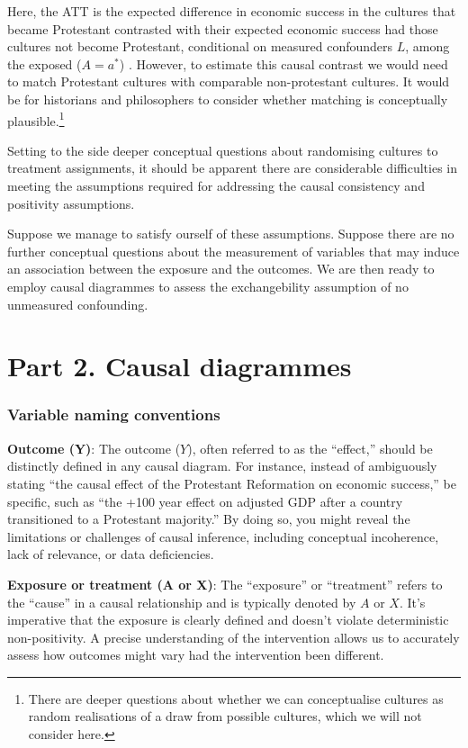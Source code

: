 \documentclass[
  singlecolumn]{report}
\begin{document}
Here, the ATT is the expected difference in economic success in the
cultures that became Protestant contrasted with their expected economic
success had those cultures not become Protestant, conditional on
measured confounders \(L\), among the exposed (\(A = a^*\)) . However,
to estimate this causal contrast we would need to match Protestant
cultures with comparable non-protestant cultures. It would be for
historians and philosophers to consider whether matching is conceptually
plausible.\footnote{There are deeper questions about whether we can
  conceptualise cultures as random realisations of a draw from possible
  cultures, which we will not consider here.}

Setting to the side deeper conceptual questions about randomising
cultures to treatment assignments, it should be apparent there are
considerable difficulties in meeting the assumptions required for
addressing the causal consistency and positivity assumptions.

Suppose we manage to satisfy ourself of these assumptions. Suppose there
are no further conceptual questions about the measurement of variables
that may induce an association between the exposure and the outcomes. We
are then ready to employ causal diagrammes to assess the exchangebility
assumption of no unmeasured confounding.

\hypertarget{part-2.-causal-diagrammes}{%
\section{Part 2. Causal diagrammes}\label{part-2.-causal-diagrammes}}

\hypertarget{variable-naming-conventions}{%
\subsubsection{Variable naming
conventions}\label{variable-naming-conventions}}

\textbf{Outcome (Y)}: The outcome (\(Y\)), often referred to as the
``effect,'' should be distinctly defined in any causal diagram. For
instance, instead of ambiguously stating ``the causal effect of the
Protestant Reformation on economic success,'' be specific, such as ``the
+100 year effect on adjusted GDP after a country transitioned to a
Protestant majority.'' By doing so, you might reveal the limitations or
challenges of causal inference, including conceptual incoherence, lack
of relevance, or data deficiencies.

\textbf{Exposure or treatment (A or X)}: The ``exposure'' or
``treatment'' refers to the ``cause'' in a causal relationship and is
typically denoted by \(A\) or \(X\). It's imperative that the exposure
is clearly defined and doesn't violate deterministic non-positivity. A
precise understanding of the intervention allows us to accurately assess
how outcomes might vary had the intervention been different.
\end{document}
